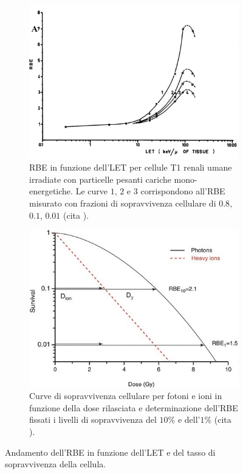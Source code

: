 \documentclass[12pt,a4paper,twoside]{report}
\begin{document}
	\begin{figure}[H]
		\centering
		\begin{subfigure}[t]{0.49\textwidth}
			\centering
 			\includegraphics[width=\textwidth, scale=0.5]{let_rbe1.png}
			\caption{RBE in funzione dell'LET per cellule T1 renali umane irradiate con particelle pesanti cariche mono-energetiche. Le curve $1$, $2$ e $3$ corrispondono all'RBE misurato con frazioni di sopravvivenza cellulare di $0.8$, $0.1$, $0.01$ (cita
				).}
			\label{fig:let_rbe}
		\end{subfigure}
		\hfill
		\begin{subfigure}[t]{0.49\textwidth}
			\centering
			\includegraphics[width=\textwidth, scale=0.5]{survival_dose.jpg}
			\caption{Curve di sopravvivenza cellulare per fotoni e ioni in funzione della dose rilasciata e determinazione dell'RBE fissati i livelli di sopravvivenza del $10\%$ e dell'$1\%$ (cita
				).}
			\label{fig:survival_dose}
		\end{subfigure}
		\caption{Andamento dell'RBE in funzione dell'LET e del tasso di sopravvivenza della cellula.}
	\end{figure}
		
\end{document}
